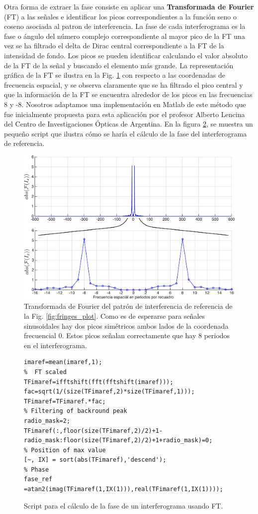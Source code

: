 Otra forma de extraer la fase consiste en aplicar una \textbf{Transformada de
Fourier} (FT) a las señales e identificar los picos correspondientes a
la función seno o coseno asociada al patron de interferencia. La fase
de cada interferograma es la fase o ángulo del número complejo 
correspondiente al mayor pico de la FT una vez se ha filtrado el delta
de Dirac central correspondiente a la FT de la intensidad de fondo.  
Los picos se pueden identificar calculando el valor absoluto de la FT de
la señal y buscando el elemento más grande. La representación gráfica
de la FT se ilustra en la Fig. \ref{fig:fringes_f} con respecto a las
coordenadas de frecuencia espacial, y se observa claramente que se ha
filtrado el pico central y que la información de la FT se encuentra
alrededor de los picos en las frecuencias  8 y -8. Nosotros adaptamos
una implementación en Matlab de este método que fue inicialmente
propuesta para esta aplicación por el profesor Alberto Lencina del Centro de
Investigaciones Ópticas de Argentina. En la figura \ref{fig:fourier_script}, se muestra un
pequeño script que ilustra cómo se haría el cálculo de la fase del
interferograma de referencia.     
\begin{figure}[H]
\centering
\includegraphics[scale=0.4]{fringes_f_both.pdf}
\caption[Transformada de Fourier de un patrón de
interferencia]{Transformada de Fourier del patrón de interferencia de referencia de la Fig. \ref{fig:fringes_plot}. Como es de
  esperarse para señales sinusoidales hay dos picos simétricos ambos
  lados de la coordenada frecuencial 0. Estos picos señalan correctamente que hay 8
  periodos en el interferograma.}
\label{fig:fringes_f}
\end{figure}
 \begin{figure}[H]
\begin{lstlisting}[style=Matlab]
%  Reference image
imaref=mean(imaref,1);
%  FT scaled 
TFimaref=ifftshift(fft(fftshift(imaref)));
fac=sqrt(1/(size(TFimaref,2)*size(TFimaref,1)));
TFimaref=TFimaref.*fac;
% Filtering of backround peak
radio_mask=2;
TFimaref(:,floor(size(TFimaref,2)/2)+1-radio_mask:floor(size(TFimaref,2)/2)+1+radio_mask)=0;
% Position of max value
[~, IX] = sort(abs(TFimaref),'descend');
% Phase
fase_ref =atan2(imag(TFimaref(1,IX(1))),real(TFimaref(1,IX(1))));
\end{lstlisting}
 \caption{Script para el cálculo de la fase de un interferograma usando
 FT.}
 \label{fig:fourier_script}
 \end{figure}
